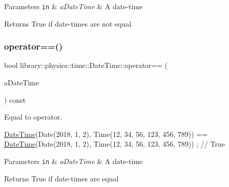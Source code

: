 \begin{DoxyParams}[1]{Parameters}
\mbox{\tt in}  & {\em a\+Date\+Time} & A date-\/time \\
\hline
\end{DoxyParams}
\begin{DoxyReturn}{Returns}
True if date-\/times are not equal 
\end{DoxyReturn}
\mbox{\label{classlibrary_1_1physics_1_1time_1_1_date_time_a5b0e9a861247e7132cdd6880a7ec2381}} 
\subsubsection{\texorpdfstring{operator==()}{operator==()}}
{\footnotesize\ttfamily bool library\+::physics\+::time\+::\+Date\+Time\+::operator== (\begin{DoxyParamCaption}\item[{const \hyperlink{classlibrary_1_1physics_1_1time_1_1_date_time}{Date\+Time} \&}]{a\+Date\+Time }\end{DoxyParamCaption}) const}



Equal to operator. 


\begin{DoxyCode}
\hyperlink{classlibrary_1_1physics_1_1time_1_1_date_time_a4ea629e533f335c928e037c4ead4646e}{DateTime}(Date(2018, 1, 2), Time(12, 34, 56, 123, 456, 789)) == \hyperlink{classlibrary_1_1physics_1_1time_1_1_date_time_a4ea629e533f335c928e037c4ead4646e}{DateTime}(Date(2018, 1, 2), 
      Time(12, 34, 56, 123, 456, 789)) ; \textcolor{comment}{// True}
\end{DoxyCode}



\begin{DoxyParams}[1]{Parameters}
\mbox{\tt in}  & {\em a\+Date\+Time} & A date-\/time \\
\hline
\end{DoxyParams}
\begin{DoxyReturn}{Returns}
True if date-\/times are equal 
\end{DoxyReturn}
\mbox{\label{classlibrary_1_1physics_1_1time_1_1_date_time_ae14e7677611cf32f61e57a874d31c0be}} 
